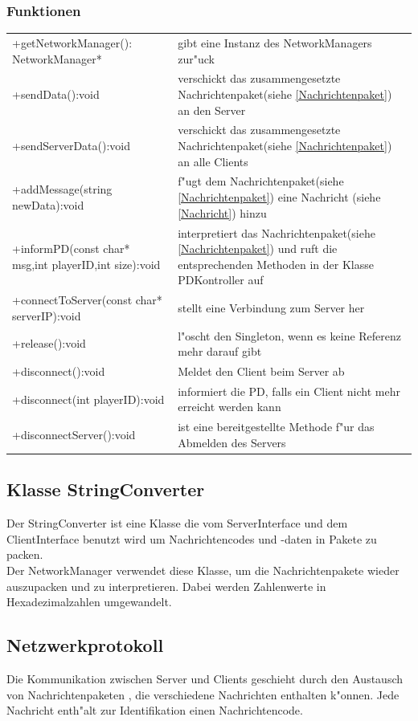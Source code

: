 \subsubsection{Funktionen}
\begin{tabular}{p{50mm}p{90mm}}
+getNetworkManager(): NetworkManager*&gibt eine Instanz des NetworkManagers zur"uck\\
+sendData():void&verschickt das zusammengesetzte Nachrichtenpaket(siehe \ref{Nachrichtenpaket}) an den Server\\
+sendServerData():void&verschickt das zusammengesetzte Nachrichtenpaket(siehe \ref{Nachrichtenpaket}) an alle Clients\\
+addMessage(string newData):void&f"ugt dem Nachrichtenpaket(siehe \ref{Nachrichtenpaket}) eine Nachricht (siehe \ref{Nachricht})
	hinzu\\
+informPD(const char* msg,int playerID,int size):void&interpretiert das Nachrichtenpaket(siehe \ref{Nachrichtenpaket}) und ruft die
  entsprechenden Methoden in der Klasse PDKontroller auf\\
+connectToServer(const char* serverIP):void&stellt eine Verbindung zum Server her\\
+release():void&l"oscht den Singleton, wenn es keine Referenz mehr darauf gibt\\
+disconnect():void&Meldet den Client beim Server ab\\
+disconnect(int playerID):void&informiert die PD, falls ein Client nicht mehr erreicht werden kann \\
+disconnectServer():void&ist eine bereitgestellte Methode f"ur das Abmelden des Servers\\
\end{tabular}


\subsection{Klasse StringConverter}
Der StringConverter ist eine Klasse die vom ServerInterface und dem ClientInterface
benutzt wird um Nachrichtencodes und -daten in Pakete zu packen.\\
Der NetworkManager verwendet diese Klasse, um die Nachrichtenpakete wieder
auszupacken und zu interpretieren. Dabei werden Zahlenwerte in Hexadezimalzahlen umgewandelt.

\subsection{Netzwerkprotokoll}
Die Kommunikation zwischen Server und Clients geschieht durch den Austausch von Nachrichtenpaketen
, die verschiedene Nachrichten enthalten k"onnen. Jede Nachricht enth"alt zur Identifikation einen Nachrichtencode.
